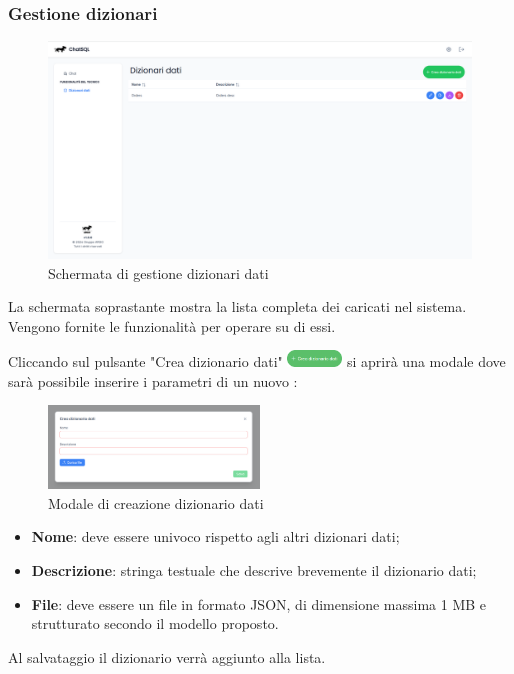 \subsubsection{Gestione dizionari}
\begin{figure}[H]
  \centering
  \includegraphics[width=1\textwidth]{assets/dd_list.png}
  \caption{Schermata di gestione dizionari dati}
\end{figure}
\par La schermata soprastante mostra la lista completa dei  caricati nel sistema. Vengono fornite le funzionalità per operare su di essi.

Cliccando sul pulsante "Crea dizionario dati" \includegraphics[height=1.2em]{assets/dd_create_button.png} si aprirà una modale dove sarà possibile inserire i parametri di un nuovo :
\begin{figure}[H]
  \centering
  \includegraphics[width=0.5\textwidth]{assets/dd_modal_create.png}
  \caption{Modale di creazione dizionario dati}
\end{figure}
\begin{itemize}
  \item \textbf{Nome}: deve essere univoco rispetto agli altri dizionari dati;
  \item \textbf{Descrizione}: stringa testuale che descrive brevemente il dizionario dati;
  \item \textbf{File}: deve essere un file in formato JSON, di dimensione massima 1 MB e strutturato secondo il modello proposto.
\end{itemize}
\vspace{0.5\baselineskip}
\par Al salvataggio il dizionario verrà aggiunto alla lista.

